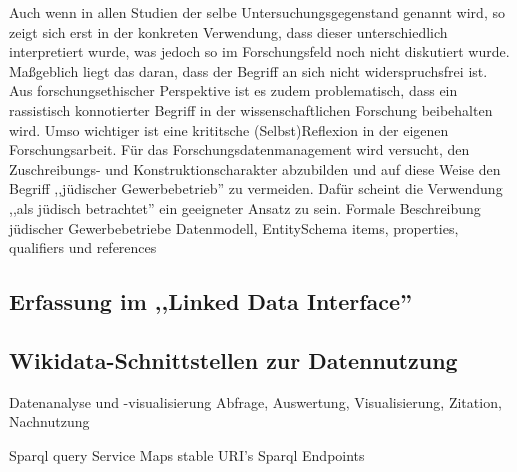 Auch wenn in allen Studien der selbe Untersuchungsgegenstand genannt wird, so zeigt sich erst in der konkreten Verwendung, dass dieser unterschiedlich interpretiert wurde, was jedoch so im Forschungsfeld noch nicht diskutiert wurde. Maßgeblich liegt das daran, dass der Begriff an sich nicht widerspruchsfrei ist. Aus forschungsethischer Perspektive ist es zudem problematisch, dass ein rassistisch konnotierter Begriff in der wissenschaftlichen Forschung beibehalten wird. Umso wichtiger ist eine krititsche (Selbst)Reflexion in der eigenen Forschungsarbeit. Für das Forschungsdatenmanagement wird versucht, den Zuschreibungs- und Konstruktionscharakter abzubilden und auf diese Weise den Begriff ,,jüdischer Gewerbebetrieb'' zu vermeiden. Dafür scheint die Verwendung ,,als jüdisch betrachtet'' ein geeigneter Ansatz zu sein.
Formale Beschreibung jüdischer Gewerbebetriebe Datenmodell, 
EntitySchema items, properties, qualifiers und references
\subsection{Erfassung im ,,Linked Data Interface''}

\subsection{Wikidata-Schnittstellen zur Datennutzung}
Datenanalyse und -visualisierung
Abfrage, Auswertung, Visualisierung, Zitation, Nachnutzung

Sparql query Service
Maps
stable URI's
Sparql Endpoints
